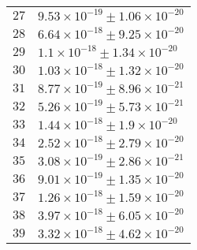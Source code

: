 \begin{tabular}{| p{} | p{} |}
$27$ & $9.53\times 10^{-19} \pm 1.06\times10^{-20}$\\
$28$ & $6.64\times 10^{-18} \pm 9.25\times10^{-20}$\\
$29$ & $1.1\times 10^{-18} \pm 1.34\times10^{-20}$\\
$30$ & $1.03\times 10^{-18} \pm 1.32\times10^{-20}$\\
$31$ & $8.77\times 10^{-19} \pm 8.96\times10^{-21}$\\
$32$ & $5.26\times 10^{-19} \pm 5.73\times10^{-21}$\\
$33$ & $1.44\times 10^{-18} \pm 1.9\times10^{-20}$\\
$34$ & $2.52\times 10^{-18} \pm 2.79\times10^{-20}$\\
$35$ & $3.08\times 10^{-19} \pm 2.86\times10^{-21}$\\
$36$ & $9.01\times 10^{-19} \pm 1.35\times10^{-20}$\\
$37$ & $1.26\times 10^{-18} \pm 1.59\times10^{-20}$\\
$38$ & $3.97\times 10^{-18} \pm 6.05\times10^{-20}$\\
$39$ & $3.32\times 10^{-18} \pm 4.62\times10^{-20}$\\
\hline
\end{tabular}
